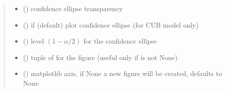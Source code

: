 \documentclass[letterpaper,10pt,english]{sphinxmanual}
\begin{document}
\begin{fulllineitems}
\begin{quote}
\begin{description}
\begin{itemize}
\item {} 
\sphinxAtStartPar
{} () \textendash{} confidence ellipse transparency

\item {} 
\sphinxAtStartPar
{} () \textendash{} if  (default) plot confidence ellipse (for CUB model only)

\item {} 
\sphinxAtStartPar
{} () \textendash{} level \((1-\alpha/2)\) for the confidence ellipse

\item {} 
\sphinxAtStartPar
{} () \textendash{} tuple of  for the figure (useful only if  is not None)

\item {} 
\sphinxAtStartPar
{} (\sphinxstyleliteralemphasis{\sphinxupquote{, }}) \textendash{} matplotlib axis, if None a new figure will be created, defaults to None

\end{itemize}

\sphinxAtStartPar
{}

\end{description}\end{quote}

\end{fulllineitems}

\end{document}
